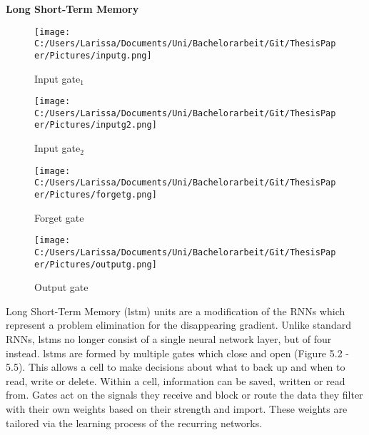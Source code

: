 \documentclass[a4paper, 11pt,titlepage,oneside,openany]{book}
\begin{document}
\noindent \textbf{Long Short-Term Memory} \\
\begin{figure}[h]
	\begin{minipage}[b]{0.5\linewidth}
		\texttt{[image: C:/Users/Larissa/Documents/Uni/Bachelorarbeit/Git/ThesisPaper/Pictures/inputg.png]}
		\caption{Input gate$_1$ \cite{rnn}}
	\end{minipage}
	\hfill
	\begin{minipage}[b]{0.5\linewidth}
		\texttt{[image: C:/Users/Larissa/Documents/Uni/Bachelorarbeit/Git/ThesisPaper/Pictures/inputg2.png]}
		\caption{Input gate$_2$ \cite{rnn}}
	\end{minipage}
	\begin{minipage}[b]{0.5\linewidth}
		\texttt{[image: C:/Users/Larissa/Documents/Uni/Bachelorarbeit/Git/ThesisPaper/Pictures/forgetg.png]}
		\caption{Forget gate \cite{rnn}}
	\end{minipage}
	\hfill
	\begin{minipage}[b]{0.8\linewidth}
		\texttt{[image: C:/Users/Larissa/Documents/Uni/Bachelorarbeit/Git/ThesisPaper/Pictures/outputg.png]}
		\caption{Output gate \cite{rnn}}
	\end{minipage}
\end{figure}
Long Short-Term Memory (\gls{lstm}) units \cite{lstm} are a modification of the RNNs which represent a problem elimination for the disappearing gradient. Unlike standard RNNs, \gls{lstm}s no longer consist of a single neural network layer, but of four instead. \gls{lstm}s are formed by multiple gates which close and open (Figure 5.2 - 5.5). This allows a cell to make decisions about what to back up and when to read, write or delete. Within a cell, information can be saved, written or read from. Gates act on the signals they receive and block or route the data they filter with their own weights based on their strength and import. These weights are tailored via the learning process of the recurring networks. 
\end{document}
